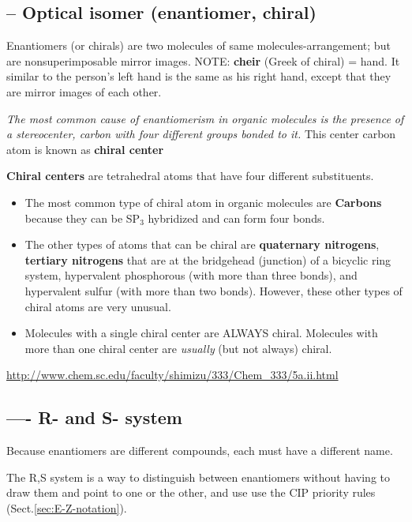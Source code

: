 \subsection{-- Optical isomer (enantiomer, chiral)}
\label{sec:optical-isomer}
\label{sec:enantiomer}
\label{sec:chiral-center}

Enantiomers (or chirals) are two molecules of same molecules-arrangement; but
are nonsuperimposable mirror images.
NOTE: {\bf cheir} (Greek of chiral) = hand.
It similar to the person's left hand is the same as his right hand, except that
they are mirror images of each other.

{\it The most common cause of enantiomerism in organic molecules is the presence
of a stereocenter, carbon with four different groups bonded to it.}
This center carbon atom is known as {\bf chiral center}

{\bf Chiral centers} are tetrahedral atoms that have four different
substituents. 
\begin{itemize}
  \item  The most common type of chiral atom in organic molecules are
{\bf Carbons} because they can be SP$_3$ hybridized and can form four bonds.
  
  \item The other types of atoms that can be chiral are {\bf quaternary
  nitrogens}, {\bf tertiary nitrogens} that are at the bridgehead (junction) of
  a bicyclic ring system, hypervalent phosphorous (with more than three bonds),
  and hypervalent sulfur (with more than two bonds).  However, these other types
  of chiral atoms are very unusual.
  
  \item Molecules with a single chiral center are ALWAYS chiral. Molecules with
  more than one chiral center are {\it usually} (but not always) chiral.
\end{itemize}
\url{http://www.chem.sc.edu/faculty/shimizu/333/Chem_333/5a.ii.html}

\subsection{---- R- and S- system}
\label{sec:R,S-system}

Because enantiomers are different compounds, 
each must have a different name.

The R,S system is a way to distinguish between enantiomers without having to
draw them and point to one or the other, and use use the CIP priority rules
(Sect.\ref{sec:E-Z-notation}).

